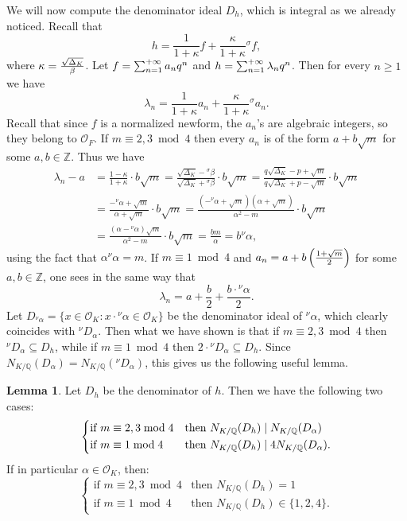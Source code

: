 \documentclass[11pt]{amsart}
\theoremstyle{definition}
\newtheorem{lem}[definizione]{Lemma}
\begin{document}
		We will now compute the denominator ideal $D_h$, which is integral as we already noticed. Recall that
		$$h=\frac{1}{1+\kappa}f+\frac{\kappa}{1+\kappa}{{}^\sigma\!} f,$$
		where ${\displaystyle} \kappa=\frac{\sqrt{\Delta_K}}{\beta}$. Let ${\displaystyle} f=\sum_{n=1}^{+\infty}a_nq^n$ and ${\displaystyle} h=\sum_{n=1}^{+\infty}\lambda_nq^n$. Then for every $n\geq 1$ we have
		$$\lambda_n=\frac{1}{1+\kappa}a_n+\frac{\kappa}{1+\kappa}{{}^\sigma\!} a_n.$$
		Recall that since $f$ is a normalized newform, the $a_n$'s are algebraic integers, so they belong to ${\mathcal{O}}_F$. If $m\equiv 2,3\bmod 4$ then every $a_n$ is of the form $a+b\sqrt{m}$ for some $a,b\in {\mathbb{Z}}$. Thus we have
		\begin{equation*}\begin{split}
		\lambda_n-a & =\frac{1-\kappa}{1+\kappa}\cdot b\sqrt{m}=\frac{\sqrt{\Delta_K}-{{}^\sigma\!}\beta}{\sqrt{\Delta_K}+{{}^\sigma\!}\beta}\cdot b\sqrt{m}=\frac{q\sqrt{\Delta_K}-p+\sqrt{m}}{q\sqrt{\Delta_K}+p-\sqrt{m}}\cdot b\sqrt{m}\\
		 & =\frac{-{{}^\nu\!}\alpha+\sqrt{m}}{\alpha+\sqrt{m}}\cdot b\sqrt{m}=\frac{(-{{}^\nu\!}\alpha+\sqrt{m})(\alpha+\sqrt{m})}{\alpha^2-m}\cdot b\sqrt{m}\\
			& =\frac{(\alpha-{{}^\nu\!}\alpha)\sqrt{m}}{\alpha^2-m}\cdot b\sqrt{m}=\frac{bm}{\alpha}=b{{}^\nu\!}\alpha,
		\end{split}
		\end{equation*}
		using the fact that $\alpha{{}^\nu\!}\alpha=m$.
		If $m\equiv 1\bmod 4$ and ${\displaystyle} a_n=a+b\left(\frac{1+\sqrt{m}}{2}\right)$ for some $a,b\in {\mathbb{Z}}$, one sees in the same way that
		$$\lambda_n=a+\frac{b}{2}+\frac{b\cdot{{}^\nu\!}\alpha}{2}.$$
		Let $D_{{{}^\nu\!}\alpha}=\{x\in {\mathcal{O}}_K\colon x\cdot {{}^\nu\!}\alpha\in {\mathcal{O}}_K\}$ be the denominator ideal of ${{}^\nu\!}\alpha$, which clearly coincides with ${{}^\nu\!} D_{\alpha}$. Then what we have shown is that if $m\equiv 2,3\bmod 4$ then ${{}^\nu\!} D_{\alpha}{\subseteq} D_h$, while if $m\equiv 1\bmod 4$ then $2 \cdot {{}^\nu\!} D_{\alpha}{\subseteq} D_h$. Since $N_{K/{\mathbb{Q}}}(D_{\alpha})=N_{K/{\mathbb{Q}}}({{}^\nu\!} D_{\alpha})$, this gives us the following useful lemma.
			\begin{lem}\label{denomid}
				Let $D_h$ be the denominator of $h$. Then we have the following two cases:
				$$\begin{dcases}
					 \mbox{if } m\equiv 2,3\bmod 4 & \mbox{then } N_{K/{\mathbb{Q}}}(D_h)\mid N_{K/{\mathbb{Q}}}(D_{\alpha})\\
					\mbox{if } m\equiv 1\bmod 4 & \mbox{then } N_{K/{\mathbb{Q}}}(D_h)\mid 4N_{K/{\mathbb{Q}}}(D_{\alpha}).
				\end{dcases}$$
		If in particular $\alpha\in {\mathcal{O}}_K$, then:
				$$\begin{cases}
					 \mbox{if } m\equiv 2,3\bmod 4 & \mbox{then } N_{K/{\mathbb{Q}}}(D_h)=1\\
					 \mbox{if } m\equiv 1\bmod 4 & \mbox{then } N_{K/{\mathbb{Q}}}(D_h)\in\{1,2,4\}.
				\end{cases}$$
		\end{lem}
\end{document}
